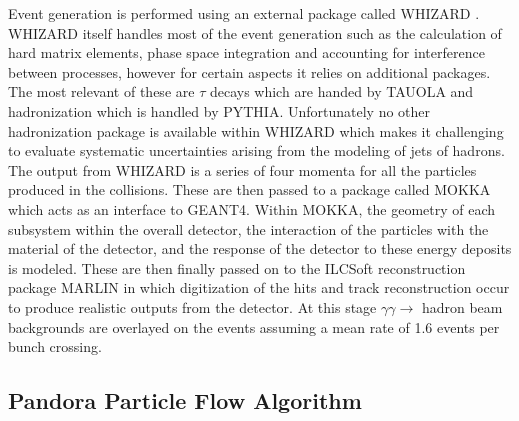 Event generation is performed using an external package called WHIZARD \cite{Kilian:2007gr}. WHIZARD itself handles most of the event generation such as the calculation of hard matrix elements, phase space integration and accounting for interference between processes, however for certain aspects it relies on additional packages. The most relevant of these are $\tau$ decays which are handed by TAUOLA\cite{Jadach:1990mz} and hadronization which is handled by PYTHIA\cite{Sjostrand:2006za}. Unfortunately no other hadronization package is available within WHIZARD which makes it challenging to evaluate systematic uncertainties arising from the modeling of jets of hadrons. The output from WHIZARD is a series of four momenta for all the particles produced in the collisions. These are then passed to a package called MOKKA which acts as an interface to GEANT4\cite{MoradeFreitas:2002kj}. Within MOKKA, the geometry of each subsystem within the overall detector, the interaction of the particles with the material of the detector, and the response of the detector to these energy deposits is modeled. These are then finally passed on to the ILCSoft reconstruction package MARLIN in which digitization of the hits and track reconstruction occur to produce realistic outputs from the detector. At this stage $\gamma\gamma\rightarrow$ hadron beam backgrounds are overlayed on the events assuming a mean rate of 1.6 events per bunch crossing\cite{CDR}.


\subsection{Pandora Particle Flow Algorithm}
\label{Pandora}

